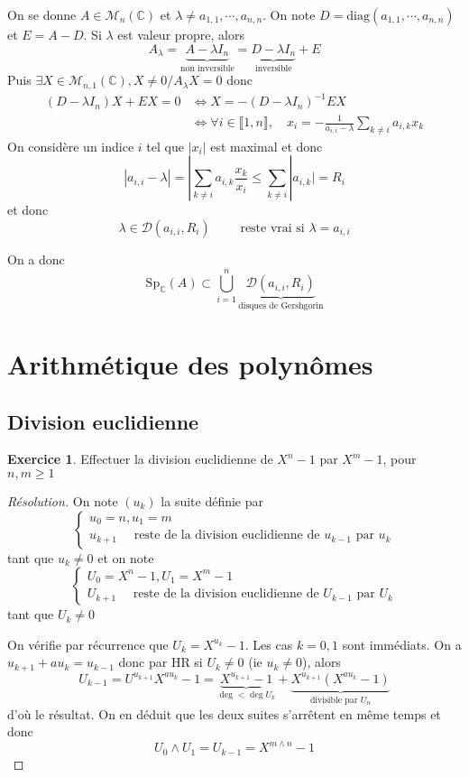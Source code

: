 \documentclass{article}
\theoremstyle{definition}
\newtheorem*{exo}{Exercice}
\begin{document}
On se donne $A\in\mathcal M_n(\mathbb C)$ et $\lambda\neq a_{1, 1}, \cdots, a_{n, n}$. On note $D=\mathrm{diag} (a_{1, 1}, \cdots, a_{n, n})$ et $E=A-D$. Si $\lambda$ est valeur propre, alors \[
    A_\lambda=\underbrace{A-\lambda I_n}_{\text{non inversible}}=\underbrace{D-\lambda I_n}_{\text{inversible}}+E
\]
Puis $\exists X\in\mathcal M_{n, 1}(\mathbb C), X\neq 0 / A_\lambda X=0$ donc \begin{align*}
    (D-\lambda I_n)X+EX=0&\iff X=-(D-\lambda I_n)^{-1}EX \\&\iff \forall i\in\llbracket 1, n\rrbracket, \quad x_i=-\frac1{a_{i, i}-\lambda}\sum_{k\neq i}a_{i, k}x_k
\end{align*}
On considère un indice $i$ tel que $|x_i|$ est maximal et donc \[
    |a_{i, i}-\lambda|=|\sum_{k\neq i}a_{i, k}\frac{x_k}{x_i}\leq \sum_{k\neq i}|a_{i, k}|=R_i
\]
et donc \[
    \lambda\in\mathcal D(a_{i, i}, R_i) \qquad \text{ reste vrai si } \lambda=a_{i, i}
\]

On a donc \[
    \mathrm{Sp}_{\mathbb C}(A)\subset \bigcup_{i=1}^n \underbrace{\mathcal D(a_{i, i}, R_i)}_{\text{disques de Gershgorin}}
\]

\section{Arithmétique des polynômes}

\subsection{Division euclidienne}

\begin{exo}
    Effectuer la division euclidienne de $X^n-1$ par $X^m-1$, pour $n, m\geq 1$
\end{exo}

\begin{proof}[Résolution]
    On note $(u_k)$ la suite définie par \[
        \begin{cases}
            u_0=n, u_1=m \\ u_{k+1} \quad \text{ reste de la division euclidienne de $u_{k-1}$ par $u_k$}
        \end{cases}
    \]
    tant que $u_k\neq 0$ et on note \[
        \begin{cases}
            U_0=X^n-1, U_1=X^m-1\\ U_{k+1}\quad \text{ reste de la division euclidienne de $U_{k-1}$ par $U_k$}
        \end{cases}
    \]
    tant que $U_k\neq 0$

    On vérifie par récurrence que $U_k=X^{u_k}-1$. Les cas $k=0, 1$ sont immédiats. On a $u_{k+1}+au_k=u_{k-1}$ donc par HR si $U_k\neq 0$ (ie $u_k\neq 0$), alors \[
        U_{k-1}=U^{u_{k+1}}X^{au_k}-1=\underbrace{X^{u_{k+1}}-1}_{\deg < \deg U_k}+\underbrace{X^{u_{k+1}}\left(X^{au_k}-1\right)}_{\text{divisible par } U_n}
    \]
    d'où le résultat. On en déduit que les deux suites s'arrêtent en même temps et donc \[
        U_0\land U_1=U_{k-1}=X^{m\land n}-1
    \]
\end{proof}
\end{document}
